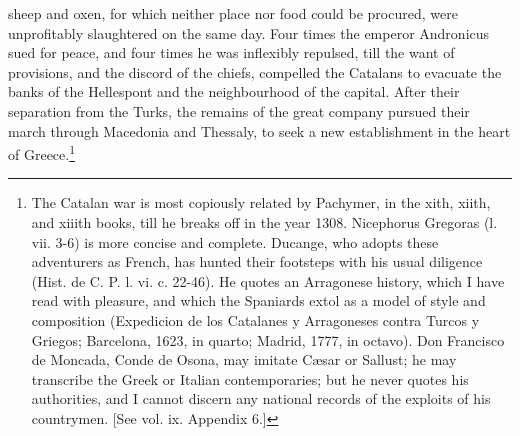 sheep and oxen, for which neither place nor food could be procured, were unprofitably slaughtered on the same day. Four times the emperor Andronicus sued for peace, and four times he was inflexibly repulsed, till the want of provisions, and the discord of the chiefs, compelled the Catalans to evacuate the banks of the Hellespont and the neighbourhood of the capital. After their separation from the Turks, the remains of the great company pursued their march through Macedonia and Thessaly, to seek a new establishment in the heart of Greece.\footnote{The Catalan war is most copiously related by Pachymer, in the xith, xiith, and xiiith books, till he breaks off in the year 1308. Nicephorus Gregoras (l. vii. 3-6) is more concise and complete. Ducange, who adopts these adventurers as French, has hunted their footsteps with his usual diligence (Hist. de C. P. l. vi. c. 22-46). He quotes an Arragonese history, which I have read with pleasure, and which the Spaniards extol as a model of style and composition (Expedicion de los Catalanes y Arragoneses contra Turcos y Griegos; Barcelona, 1623, in quarto; Madrid, 1777, in octavo). Don Francisco de Moncada, Conde de Osona, may imitate Cæsar or Sallust; he may transcribe the Greek or Italian contemporaries; but he never quotes his authorities, and I cannot discern any national records of the exploits of his countrymen. [See vol. ix. Appendix 6.]}

